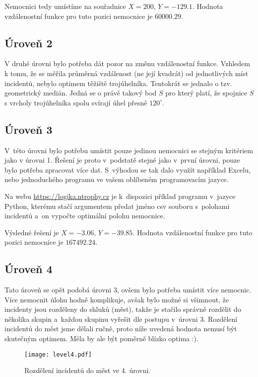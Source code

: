 \documentclass[12pt,a4paper]{article}
\begin{document}
Nemocnici tedy umístíme na souřadnice $X=200$, $Y=-129.1$. Hodnota vzdálenostní
funkce pro tuto pozici nemocnice je $60000.29$.

\subsection*{Úroveň 2}
V druhé úrovni bylo potřeba dát pozor na změnu vzdálenostní funkce. Vzhledem k tomu, že se měřila průměrná vzdálenost (ne její kvadrát) od jednotlivých míst incidentů,
nebylo optimem těžiště trojúhelníka. Tentokrát se jednalo o tzv. geometrický medián. Jedná se o právě takový bod $S$ pro který platí, že spojnice $S$ s vrcholy trojúhelníka spolu svírají úhel přesně $120^\circ$.

\subsection*{Úroveň 3}
V~této úrovni bylo potřebu umístit pouze jedinou nemocnici se stejným kritériem
jako v úrovni 1. Řešení je proto v~podstatě stejné jako v~první úrovni, pouze
bylo potřeba zpracovat více dat. S~výhodou se tak dalo využít například Excelu,
nebo jednoduchého programu ve vašem oblíbeném programovacím jazyce.

Na webu \url{https://logika.ntrophy.cz} je k~dispozici příklad programu
v~jazyce Python, kterému stačí argumentem předat jméno csv souboru s~polohami
incidentů a~on vypočte optimální polohu nemocnice.

Výsledné řešení je $X=-3.06$, $Y=-39.85$. Hodnota vzdálenostní funkce pro tuto
pozici nemocnice je $167492.24$.

\subsection*{Úroveň 4}
Tato úroveň se opět podobá úrovni 3, ovšem bylo potřeba umístit více nemocnic.
Více nemocnit úlohu hodně komplikuje, avšak bylo možné si všimnout, že
incidenty jsou rozděleny do shluků (měst), takže je stačilo správně rozdělit do
několika skupin a~každou skupinu vyřešit dle postupu v~úrovni 3. Rozdělení
incidentů do měst jsme dělali ručně, proto níže uvedená hodnota nemusí být
skutečným optimem. Měla by ale být poměrně blízko optima :).

\begin{figure}[ht]
\centering
\texttt{[image: level4.pdf]}
\caption{Rozdělení incidentů do měst ve 4. úrovni.}
\end{figure}
\end{document}
